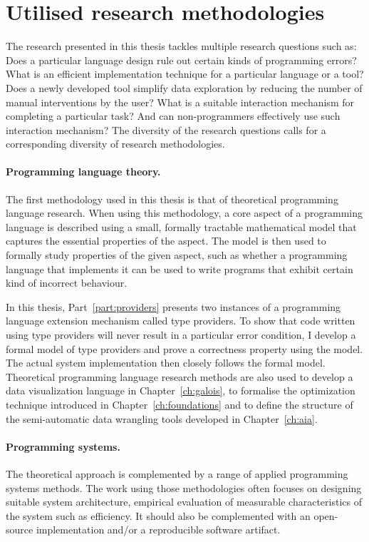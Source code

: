 \documentclass[fleqn,11pt]{report}
\theoremstyle{definition}
\begin{document}
\section{Utilised research methodologies}
The research presented in this thesis tackles multiple research questions such as:
Does a particular language design rule out certain kinds of programming errors? What is an
efficient implementation technique for a particular language or a tool? Does a newly
developed tool simplify data exploration by reducing the number of manual interventions
by the user? What is a suitable interaction mechanism for completing a particular task?
And can non-programmers effectively use such interaction mechanism?
The diversity of the research questions calls for a corresponding diversity of research
methodologies.

\vspace{-0.34em}
\paragraph{Programming language theory.}
The first methodology used in this thesis is that of theoretical programming language research.
When using this methodology, a core aspect of a programming language is described using a small,
formally tractable mathematical model that captures the essential properties of the aspect.
The model is then used to formally study properties of the given aspect, such as whether a
programming language that implements it can be used to write programs that exhibit certain kind
of incorrect behaviour.

In this thesis, Part~\ref{part:providers} presents two instances of a programming language
extension mechanism called type providers. To show that code written using type providers will
never result in a particular error condition, I develop a formal model of type providers and prove
a correctness property using the model. The actual system implementation then closely follows the
formal model. Theoretical programming language research methods are also used to develop a data
visualization language in Chapter~\ref{ch:galois}, to formalise the optimization technique introduced
in Chapter~\ref{ch:foundations} and to define the structure of the semi-automatic data wrangling
tools developed in Chapter~\ref{ch:aia}.

\vspace{-0.34em}
\paragraph{Programming systems.}
The theoretical approach is complemented by a range of applied programming systems methods.
The work using those methodologies often focuses on designing suitable system architecture,
empirical evaluation of measurable characteristics of the system such as efficiency. It should
also be complemented with an open-source implementation and/or a reproducible software artifact.
\end{document}
